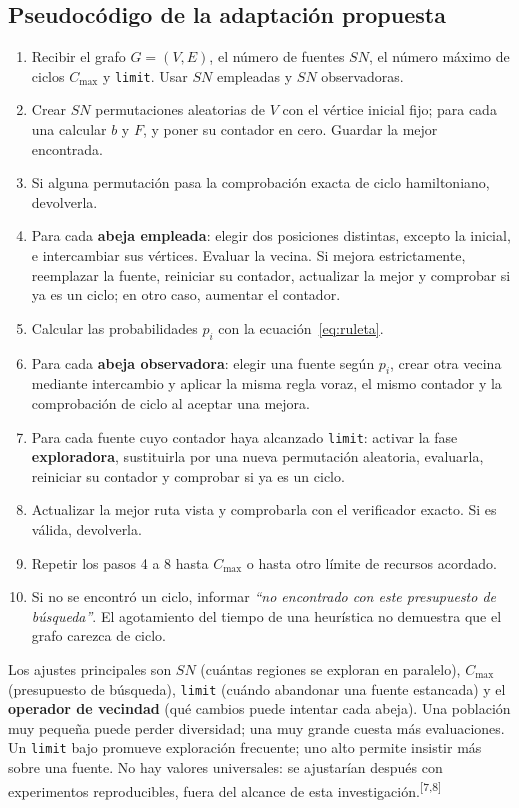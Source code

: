 \documentclass[11pt,letterpaper]{article}
\newcommand{\src}[1]{\textsuperscript{\textcolor{cian}{[#1]}}}
\begin{document}
\subsection{Pseudocódigo de la adaptación propuesta}\label{sec:pseudo}
\begin{enumerate}[leftmargin=*,label=\arabic*.]
\item Recibir el grafo $G=(V,E)$, el número de fuentes $SN$, el número máximo de ciclos $C_{\max}$ y \texttt{limit}. Usar $SN$ empleadas y $SN$ observadoras.
\item Crear $SN$ permutaciones aleatorias de $V$ con el vértice inicial fijo; para cada una calcular $b$ y $F$, y poner su contador en cero. Guardar la mejor encontrada.
\item Si alguna permutación pasa la comprobación exacta de ciclo hamiltoniano, devolverla.
\item Para cada \textbf{abeja empleada}: elegir dos posiciones distintas, excepto la inicial, e intercambiar sus vértices. Evaluar la vecina. Si mejora estrictamente, reemplazar la fuente, reiniciar su contador, actualizar la mejor y comprobar si ya es un ciclo; en otro caso, aumentar el contador.
\item Calcular las probabilidades $p_i$ con la ecuación~\eqref{eq:ruleta}.
\item Para cada \textbf{abeja observadora}: elegir una fuente según $p_i$, crear otra vecina mediante intercambio y aplicar la misma regla voraz, el mismo contador y la comprobación de ciclo al aceptar una mejora.
\item Para cada fuente cuyo contador haya alcanzado \texttt{limit}: activar la fase \textbf{exploradora}, sustituirla por una nueva permutación aleatoria, evaluarla, reiniciar su contador y comprobar si ya es un ciclo.
\item Actualizar la mejor ruta vista y comprobarla con el verificador exacto. Si es válida, devolverla.
\item Repetir los pasos 4 a 8 hasta $C_{\max}$ o hasta otro límite de recursos acordado.
\item Si no se encontró un ciclo, informar \emph{``no encontrado con este presupuesto de búsqueda''}. El agotamiento del tiempo de una heurística no demuestra que el grafo carezca de ciclo.
\end{enumerate}

Los ajustes principales son $SN$ (cuántas regiones se exploran en paralelo), $C_{\max}$ (presupuesto de búsqueda), \texttt{limit} (cuándo abandonar una fuente estancada) y el \textbf{operador de vecindad} (qué cambios puede intentar cada abeja). Una población muy pequeña puede perder diversidad; una muy grande cuesta más evaluaciones. Un \texttt{limit} bajo promueve exploración frecuente; uno alto permite insistir más sobre una fuente. No hay valores universales: se ajustarían después con experimentos reproducibles, fuera del alcance de esta investigación.\src{7,8}
\end{document}
